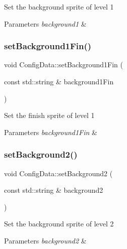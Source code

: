 Set the background sprite of level 1 
\begin{DoxyParams}{Parameters}
{\em background1} & \\
\hline
\end{DoxyParams}
\mbox{\label{classConfigData_a9f242df86492feeae19aed291af32bd3}} 
\subsubsection{\texorpdfstring{set\+Background1\+Fin()}{setBackground1Fin()}}
{\footnotesize\ttfamily void Config\+Data\+::set\+Background1\+Fin (\begin{DoxyParamCaption}\item[{const std\+::string \&}]{background1\+Fin }\end{DoxyParamCaption})}

Set the finish sprite of level 1 
\begin{DoxyParams}{Parameters}
{\em background1\+Fin} & \\
\hline
\end{DoxyParams}
\mbox{\label{classConfigData_a8502ce728edf1a3d835c5fcafe6d4e30}} 
\subsubsection{\texorpdfstring{set\+Background2()}{setBackground2()}}
{\footnotesize\ttfamily void Config\+Data\+::set\+Background2 (\begin{DoxyParamCaption}\item[{const std\+::string \&}]{background2 }\end{DoxyParamCaption})}

Set the background sprite of level 2 
\begin{DoxyParams}{Parameters}
{\em background2} & \\
\hline
\end{DoxyParams}
\mbox{\label{classConfigData_aba02fb9632f972bd7359e8deca226b26}} 
